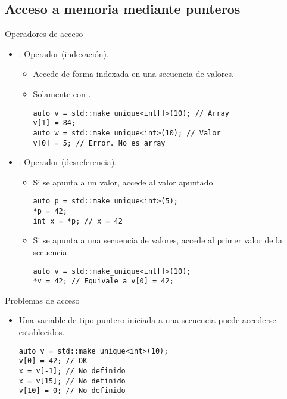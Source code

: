 \subsection{Acceso a memoria mediante punteros}

\begin{frame}[t,fragile]{Operadores de acceso}
\begin{itemize}
  \item {}: Operador \cppkey{[]} (indexación).
    \begin{itemize}
      \item Accede de forma indexada en una secuencia de valores.
      \item Solamente con .
\begin{lstlisting}
auto v = std::make_unique<int[]>(10); // Array
v[1] = 84;
auto w = std::make_unique<int>(10); // Valor
v[0] = 5; // Error. No es array
\end{lstlisting}
    \end{itemize}

  \item {}: Operador \cppkey{*} (desreferencia).
    \begin{itemize}
      \item Si se apunta a un valor, accede al valor apuntado.
\begin{lstlisting}
auto p = std::make_unique<int>(5);
*p = 42;
int x = *p; // x = 42
\end{lstlisting}

      \item Si se apunta a una secuencia de valores, accede al primer valor de la secuencia.
\begin{lstlisting}
auto v = std::make_unique<int[]>(10);
*v = 42; // Equivale a v[0] = 42;
\end{lstlisting}
    \end{itemize}
\end{itemize}
\end{frame}

\begin{frame}[t,fragile]{Problemas de acceso}
\begin{itemize}
  \item Una variable de tipo puntero iniciada a una secuencia 
         puede accederse 
         establecidos.
\begin{lstlisting}
auto v = std::make_unique<int>(10);
v[0] = 42; // OK
x = v[-1]; // No definido
x = v[15]; // No definido
v[10] = 0; // No definido
\end{lstlisting}
\end{itemize}
\end{frame}

